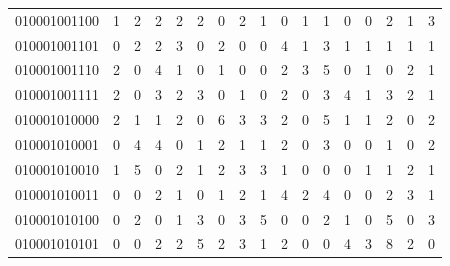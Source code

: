 \documentclass[10pt,a4paper]{article}
\begin{document}
\begin{longtable}{ |c|c|c|c|c|c|c|c|c|c|c|c|c|c|c|c|c| }
    010001001100              & 1                            & 2                                & 2                            & 2                              & 2   & 0   & 2   & 1   & 0   & 1   & 1   & 0   & 0   & 2   & 1   & 3   \\
    010001001101              & 0                            & 2                                & 2                            & 3                              & 0   & 2   & 0   & 0   & 4   & 1   & 3   & 1   & 1   & 1   & 1   & 1   \\
    010001001110              & 2                            & 0                                & 4                            & 1                              & 0   & 1   & 0   & 0   & 2   & 3   & 5   & 0   & 1   & 0   & 2   & 1   \\
    010001001111              & 2                            & 0                                & 3                            & 2                              & 3   & 0   & 1   & 0   & 2   & 0   & 3   & 4   & 1   & 3   & 2   & 1   \\
    010001010000              & 2                            & 1                                & 1                            & 2                              & 0   & 6   & 3   & 3   & 2   & 0   & 5   & 1   & 1   & 2   & 0   & 2   \\
    010001010001              & 0                            & 4                                & 4                            & 0                              & 1   & 2   & 1   & 1   & 2   & 0   & 3   & 0   & 0   & 1   & 0   & 2   \\
    010001010010              & 1                            & 5                                & 0                            & 2                              & 1   & 2   & 3   & 3   & 1   & 0   & 0   & 0   & 1   & 1   & 2   & 1   \\
    010001010011              & 0                            & 0                                & 2                            & 1                              & 0   & 1   & 2   & 1   & 4   & 2   & 4   & 0   & 0   & 2   & 3   & 1   \\
    010001010100              & 0                            & 2                                & 0                            & 1                              & 3   & 0   & 3   & 5   & 0   & 0   & 2   & 1   & 0   & 5   & 0   & 3   \\
    010001010101              & 0                            & 0                                & 2                            & 2                              & 5   & 2   & 3   & 1   & 2   & 0   & 0   & 4   & 3   & 8   & 2   & 0   \\

\end{longtable}
\end{document}
